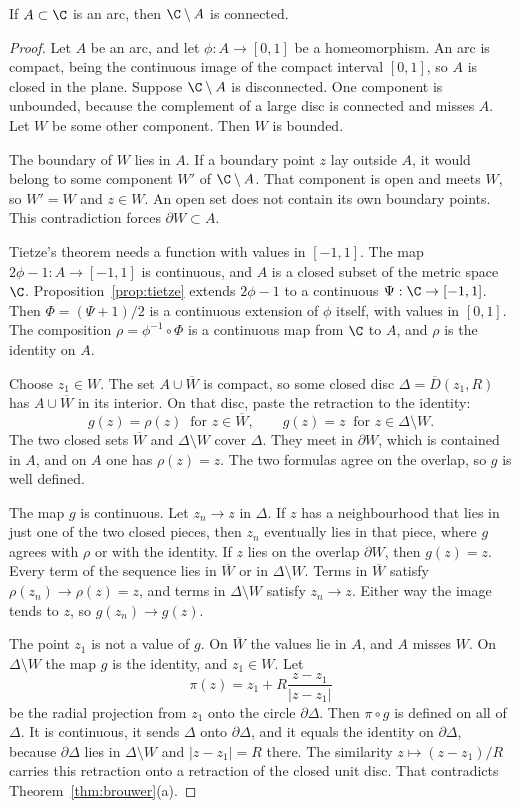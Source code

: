 \begin{lemma}\label{lem:arc}
If $A\subset\C$ is an arc, then $\C\setminus A$ is connected.
\end{lemma}
\begin{proof}
Let $A$ be an arc, and let $\phi:A\to[0,1]$ be a homeomorphism. An arc is compact, being the continuous image of the compact interval $[0,1]$, so $A$ is closed in the plane. Suppose $\C\setminus A$ is disconnected. One component is unbounded, because the complement of a large disc is connected and misses $A$. Let $W$ be some other component. Then $W$ is bounded.

The boundary of $W$ lies in $A$. If a boundary point $z$ lay outside $A$, it would belong to some component $W'$ of $\C\setminus A$. That component is open and meets $W$, so $W'=W$ and $z\in W$. An open set does not contain its own boundary points. This contradiction forces $\partial W\subset A$.

Tietze's theorem needs a function with values in $[-1,1]$. The map $2\phi-1:A\to[-1,1]$ is continuous, and $A$ is a closed subset of the metric space $\C$. Proposition~\ref{prop:tietze} extends $2\phi-1$ to a continuous $\Psi:\C\to[-1,1]$. Then $\Phi=(\Psi+1)/2$ is a continuous extension of $\phi$ itself, with values in $[0,1]$. The composition $\rho=\phi^{-1}\circ\Phi$ is a continuous map from $\C$ to $A$, and $\rho$ is the identity on $A$.

Choose $z_1\in W$. The set $A\cup\overline W$ is compact, so some closed disc $\Delta=\overline{D}(z_1,R)$ has $A\cup\overline W$ in its interior. On that disc, paste the retraction to the identity:
\[
g(z)=\rho(z)\ \text{ for }z\in\overline W,\qquad g(z)=z\ \text{ for }z\in\Delta\setminus W.
\]
The two closed sets $\overline W$ and $\Delta\setminus W$ cover $\Delta$. They meet in $\partial W$, which is contained in $A$, and on $A$ one has $\rho(z)=z$. The two formulas agree on the overlap, so $g$ is well defined.

The map $g$ is continuous. Let $z_n\to z$ in $\Delta$. If $z$ has a neighbourhood that lies in just one of the two closed pieces, then $z_n$ eventually lies in that piece, where $g$ agrees with $\rho$ or with the identity. If $z$ lies on the overlap $\partial W$, then $g(z)=z$. Every term of the sequence lies in $\overline W$ or in $\Delta\setminus W$. Terms in $\overline W$ satisfy $\rho(z_n)\to\rho(z)=z$, and terms in $\Delta\setminus W$ satisfy $z_n\to z$. Either way the image tends to $z$, so $g(z_n)\to g(z)$.

The point $z_1$ is not a value of $g$. On $\overline W$ the values lie in $A$, and $A$ misses $W$. On $\Delta\setminus W$ the map $g$ is the identity, and $z_1\in W$. Let
\[
\pi(z)=z_1+R\frac{z-z_1}{|z-z_1|}
\]
be the radial projection from $z_1$ onto the circle $\partial\Delta$. Then $\pi\circ g$ is defined on all of $\Delta$. It is continuous, it sends $\Delta$ onto $\partial\Delta$, and it equals the identity on $\partial\Delta$, because $\partial\Delta$ lies in $\Delta\setminus W$ and $|z-z_1|=R$ there. The similarity $z\mapsto(z-z_1)/R$ carries this retraction onto a retraction of the closed unit disc. That contradicts Theorem~\ref{thm:brouwer}(a).
\end{proof}

